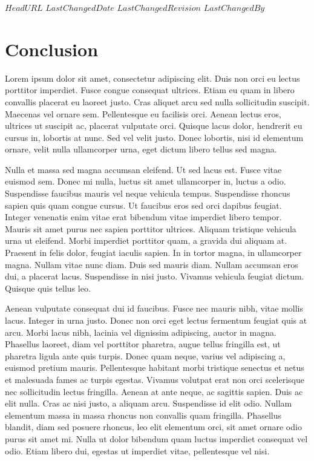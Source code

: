 \svnidlong
{$HeadURL$}
{$LastChangedDate$}
{$LastChangedRevision$}
{$LastChangedBy$}

\chapter{Conclusion}
Lorem ipsum dolor sit amet, consectetur adipiscing elit.
Duis non orci eu lectus porttitor imperdiet.
Fusce congue consequat ultrices.
Etiam eu quam in libero convallis placerat eu laoreet justo.
Cras aliquet arcu sed nulla sollicitudin suscipit.
Maecenas vel ornare sem.
Pellentesque eu facilisis orci.
Aenean lectus eros, ultrices ut suscipit ac, placerat vulputate orci.
Quisque lacus dolor, hendrerit eu cursus in, lobortis at nunc.
Sed vel velit justo.
Donec lobortis, nisi id elementum ornare, velit nulla ullamcorper urna, eget dictum libero tellus sed magna.

Nulla et massa sed magna accumsan eleifend.
Ut sed lacus est.
Fusce vitae euismod sem.
Donec mi nulla, luctus sit amet ullamcorper in, luctus a odio.
Suspendisse faucibus mauris vel neque vehicula tempus.
Suspendisse rhoncus sapien quis quam congue cursus.
Ut faucibus eros sed orci dapibus feugiat.
Integer venenatis enim vitae erat bibendum vitae imperdiet libero tempor.
Mauris sit amet purus nec sapien porttitor ultrices.
Aliquam tristique vehicula urna ut eleifend.
Morbi imperdiet porttitor quam, a gravida dui aliquam at.
Praesent in felis dolor, feugiat iaculis sapien.
In in tortor magna, in ullamcorper magna.
Nullam vitae nunc diam.
Duis sed mauris diam.
Nullam accumsan eros dui, a placerat lacus.
Suspendisse in nisi justo.
Vivamus vehicula feugiat dictum.
Quisque quis tellus leo.

Aenean vulputate consequat dui id faucibus.
Fusce nec mauris nibh, vitae mollis lacus.
Integer in urna justo.
Donec non orci eget lectus fermentum feugiat quis at arcu.
Morbi lacus nibh, lacinia vel dignissim adipiscing, auctor in magna.
Phasellus laoreet, diam vel porttitor pharetra, augue tellus fringilla est, ut pharetra ligula ante quis turpis.
Donec quam neque, varius vel adipiscing a, euismod pretium mauris.
Pellentesque habitant morbi tristique senectus et netus et malesuada fames ac turpis egestas.
Vivamus volutpat erat non orci scelerisque nec sollicitudin lectus fringilla.
Aenean at ante neque, ac sagittis sapien.
Duis ac elit nulla.
Cras ac nisi justo, a aliquam arcu.
Suspendisse id elit odio.
Nullam elementum massa in massa rhoncus non convallis quam fringilla.
Phasellus blandit, diam sed posuere rhoncus, leo elit elementum orci, sit amet ornare odio purus sit amet mi.
Nulla ut dolor bibendum quam luctus imperdiet consequat vel odio.
Etiam libero dui, egestas ut imperdiet vitae, pellentesque vel nisi.

